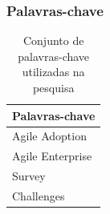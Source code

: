 \documentclass[a4paper,11pt]{article}
\begin{document}
		\subsubsection{Palavras-chave}
			\begin{table}[h]
				\centering
				\begin{tabular}{ | l | } \hline \textbf{Palavras-chave} \\ \hline
					Agile Adoption \\ \hline
					Agile Enterprise \\ \hline
					Survey \\ \hline
					Challenges \\ \hline
				\end{tabular}
				\caption{Conjunto de palavras-chave utilizadas na pesquisa}
				\label{tab:palavrasChave}
			\end{table}



\end{document}

